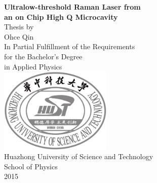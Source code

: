 \begin{titlepage}
\centering
\textbf{{\huge Ultralow-threshold Raman Laser from}}\\[0.3cm]
\textbf{{\huge an on Chip High Q Microcavity}}\\[2.5cm]
\large Thesis by\\[0.3cm]
{\Large Ohce Qin}\\[1.5cm]
In Partial Fulfillment of the Requirements\\[0.3cm]
for the Bachelor's Degree\\[0.3cm]
in Applied Physics\\[4cm]
\includegraphics[width = 0.4\textwidth]{HUST.png}~\\[1.5cm]
Huazhong University of Science and Technology\\[0.5cm]
School of Physics\\[1cm]
2015 
\end{titlepage}
